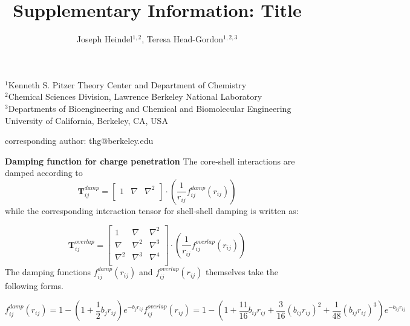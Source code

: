 \documentclass[12pt,letter]{article}
\begin{document}
\title{Supplementary Information: Title}
\author{Joseph Heindel$^{1,2}$, Teresa Head-Gordon$^{1,2,3}$}
\date{\vspace{-10ex}}
\maketitle
\noindent
\begin{center}
$^1$Kenneth S. Pitzer Theory Center and Department of Chemistry\\
$^2$Chemical Sciences Division, Lawrence Berkeley National Laboratory\\
$^3$Departments of Bioengineering and Chemical and Biomolecular Engineering\\
University of California, Berkeley, CA, USA


corresponding author: thg@berkeley.edu
\end{center}

\newpage
\textbf{Damping function for charge penetration}
The core-shell interactions are damped according to
\begin{equation}
  \bm{T}_{ij}^{damp}=
  \begin{bmatrix}
    1 & \nabla & \nabla^2 \\
  \end{bmatrix}\cdot
  \left(\frac{1}{r_{ij}}f_{ij}^{damp}(r_{ij})\right)
  \label{eq:T_damp}
\end{equation}
\noindent
while the corresponding interaction tensor for shell-shell damping is written as:

\begin{equation}
  \bm{T}_{ij}^{overlap}=
  \begin{bmatrix}
    1 & \nabla & \nabla^2 \\
    \nabla & \nabla^2 & \nabla^3 \\
    \nabla^2 & \nabla^3 & \nabla^4 \\
  \end{bmatrix}\cdot
  \left(\frac{1}{r_{ij}}f_{ij}^{overlap}(r_{ij})\right)
  \label{eq:T_overlap}
\end{equation}
\noindent
The damping functions $f_{ij}^{damp}(r_{ij})$ and $f_{ij}^{overlap}(r_{ij})$ themselves take the following forms.

\begin{subequations}
  \begin{equation}
    f_{ij}^{damp}(r_{ij})=1-\left(1+\frac12b_{j}r_{ij}\right)e^{-b_{j}r_{ij}}
    \label{eq:damp_a}
  \end{equation}
  \begin{equation}
    f_{ij}^{overlap}(r_{ij})=1-\left(1+\frac{11}{16}b_{ij}r_{ij}+\frac{3}{16}(b_{ij}r_{ij})^2+\frac{1}{48}(b_{ij}r_{ij})^3\right)e^{-b_{ij}r_{ij}} 
    \label{eq:damp_b}
  \end{equation}
\end{subequations}
\noindent
\end{document}
